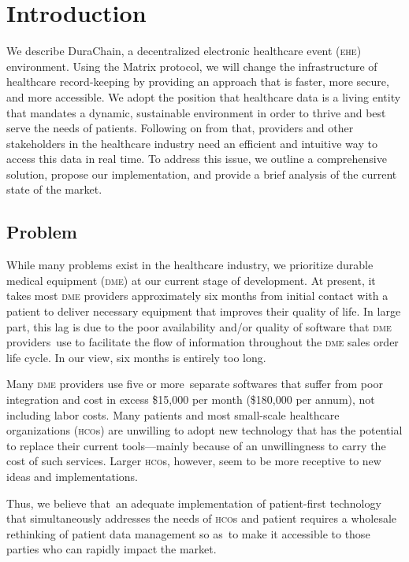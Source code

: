 
\section{Introduction}
We describe DuraChain, a decentralized electronic healthcare event (\textsc{ehe}) environment. Using the Matrix protocol,\cite{matrixspec}
we will change the infrastructure of healthcare record-keeping by providing an approach that is faster, more secure, and more accessible. We adopt the position that healthcare data is a living entity that mandates a dynamic, sustainable environment in order to thrive and best serve the needs of patients. Following on from that, providers and other stakeholders in the healthcare industry need an efficient and intuitive way to access this data in real time. To address this issue, we outline a comprehensive solution, propose our implementation, and provide a brief analysis of the current state of the market.%

\subsection{Problem}
While many problems exist in the healthcare industry, we prioritize durable medical equipment (\textsc{dme}) at our current stage of development. At present, it takes most \textsc{dme} providers approximately six months from initial contact with a patient to deliver necessary equipment that improves their quality of life. In large part, this lag is due to the poor availability and/or quality of software that \textsc{dme} providers use to facilitate the flow of information throughout the \textsc{dme} sales order life cycle. In our view, six months is entirely too long.%

Many \textsc{dme} providers use five or more separate softwares that suffer from poor integration and cost in excess \$15,000 per month (\$180,000 per annum), not including labor costs. Many patients and most small-scale healthcare organizations (\textsc{hco}s) are unwilling to adopt new technology that has the potential to replace their current tools---mainly because of an unwillingness to carry the cost of such services. Larger \textsc{hco}s, however, seem to be more receptive to new ideas and implementations.﻿%

Thus, we believe that an adequate implementation of patient-first technology that simultaneously addresses the needs of \textsc{hco}s and patient requires a wholesale rethinking of patient data management so as to make it accessible to those parties who can rapidly impact the market.%


